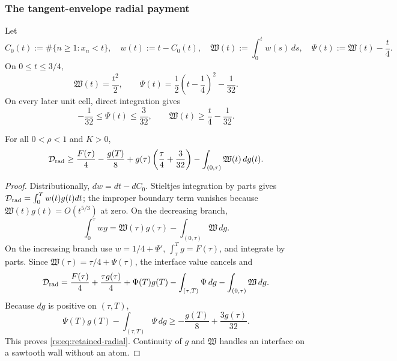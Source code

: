 \subsubsection*{The tangent-envelope radial payment}

Let
\begin{equation}
 C_0(t):=\#\{n\geq1:x_n<t\},
 \quad w(t):=t-C_0(t),
 \quad \mathfrak W(t):=\int_0^tw(s)\,ds,
 \quad \Psi(t):=\mathfrak W(t)-\frac t4.
 \label{rs:eq:sawtooth}
\end{equation}
On $0\leq t\leq3/4$,
\begin{equation}
 \mathfrak W(t)=\frac{t^2}{2},
 \qquad
 \Psi(t)=\frac12\left(t-\frac14\right)^2-\frac1{32}.
 \label{rs:eq:first-cell}
\end{equation}
On every later unit cell, direct integration gives
\begin{equation}
 -\frac1{32}\leq\Psi(t)\leq\frac3{32},
 \qquad
 \mathfrak W(t)\geq\frac t4-\frac1{32}.
 \label{rs:eq:sawtooth-bounds}
\end{equation}

\begin{lemma}
\label{rs:lem:retained}
For all $0<\rho<1$ and $K>0$,
\begin{equation}
 \mathcal D_{\rm rad}
 \geq\frac{F(\tau)}4-\frac{g(T)}8
 +g(\tau)\left(\frac\tau4+\frac3{32}\right)
 -\int_{(0,\tau)}\mathfrak W(t)\,dg(t).
 \label{rs:eq:retained-radial}
\end{equation}
\end{lemma}

\begin{proof}
Distributionally, $dw=dt-dC_0$.  Stieltjes integration by parts gives
$\mathcal D_{\rm rad}=\int_0^Tw(t)g(t)dt$; the improper boundary term
vanishes because $\mathfrak W(t)g(t)=O(t^{5/3})$ at zero.  On the
decreasing branch,
\[
 \int_0^\tau wg
 =\mathfrak W(\tau)g(\tau)
  -\int_{(0,\tau)}\mathfrak W\,dg.
\]
On the increasing branch use $w=1/4+\Psi'$,
$\int_\tau^Tg=F(\tau)$, and integrate by parts.  Since
$\mathfrak W(\tau)=\tau/4+\Psi(\tau)$, the interface value cancels and
\[
 \mathcal D_{\rm rad}
 =\frac{F(\tau)}4+\frac{\tau g(\tau)}4
  +\Psi(T)g(T)-\int_{(\tau,T)}\Psi\,dg
  -\int_{(0,\tau)}\mathfrak W\,dg.
\]
Because $dg$ is positive on $(\tau,T)$,
\[
 \Psi(T)g(T)-\int_{(\tau,T)}\Psi\,dg
 \geq-\frac{g(T)}8+\frac{3g(\tau)}{32}.
\]
This proves \eqref{rs:eq:retained-radial}.  Continuity of $g$ and
$\mathfrak W$ handles an interface on a sawtooth wall without an atom.
\end{proof}

